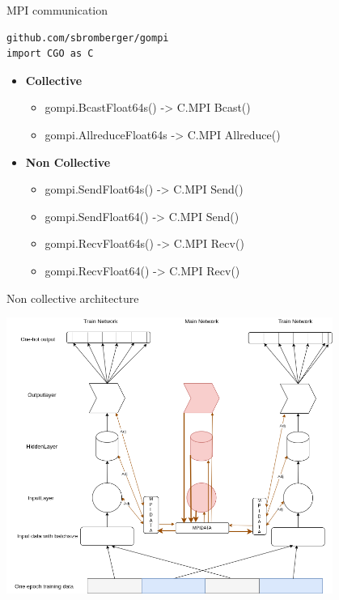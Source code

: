 \documentclass[presentation]{beamer}
\begin{document}
\begin{frame}[label={sec:orgcef7e89},fragile]{MPI communication}
 \begin{verbatim}
github.com/sbromberger/gompi
import CGO as C
\end{verbatim}

\begin{itemize}
\item \textbf{Collective}
\begin{itemize}
\item gompi.BcastFloat64s() -> C.MPI \textunderscore Bcast()
\item gompi.AllreduceFloat64s -> C.MPI \textunderscore Allreduce()
\end{itemize}

\item \textbf{Non Collective}
\begin{itemize}
\item gompi.SendFloat64s() -> C.MPI \textunderscore Send()
\item gompi.SendFloat64() -> C.MPI \textunderscore Send()
\item gompi.RecvFloat64s() -> C.MPI \textunderscore Recv()
\item gompi.RecvFloat64() -> C.MPI \textunderscore Recv()
\end{itemize}
\end{itemize}
\end{frame}

\begin{frame}[label={sec:org576e8a6}]{Non collective architecture}
\begin{center}
\includegraphics[width=0.8\textwidth]{./png/MPINetworkSendRecv.png}
\end{center}
\end{frame}
\end{document}
